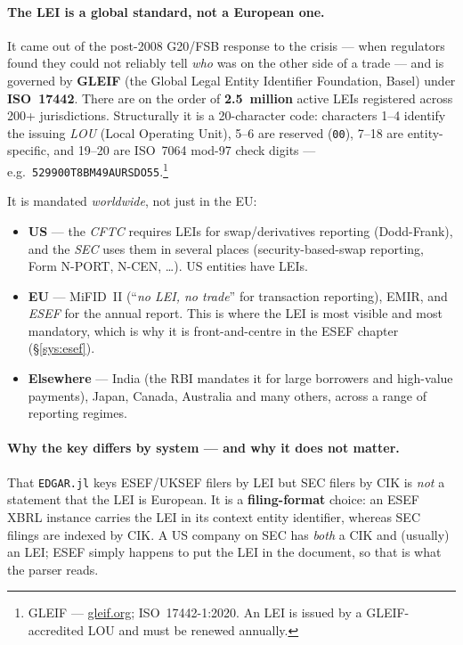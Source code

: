 \documentclass[11pt,a4paper]{report}
\begin{document}
\paragraph{The LEI is a global standard, not a European one.} It came out of the post-2008 G20/FSB response to
the crisis --- when regulators found they could not reliably tell \emph{who} was on the other side of a trade
--- and is governed by \textbf{GLEIF} (the Global Legal Entity Identifier Foundation, Basel) under
\textbf{ISO~17442}. There are on the order of \textbf{2.5~million} active LEIs registered across 200+
jurisdictions. Structurally it is a 20-character code: characters 1--4 identify the issuing \emph{LOU} (Local
Operating Unit), 5--6 are reserved (\texttt{00}), 7--18 are entity-specific, and 19--20 are ISO~7064 mod-97
check digits --- e.g.\ \texttt{529900T8BM49AURSDO55}.\footnote{GLEIF --- \href{https://www.gleif.org}{gleif.org};
ISO~17442-1:2020. An LEI is issued by a GLEIF-accredited LOU and must be renewed annually.}

\noindent It is mandated \emph{worldwide}, not just in the EU:
\begin{itemize}[nosep]
  \item \textbf{US} --- the \emph{CFTC} requires LEIs for swap/derivatives reporting (Dodd-Frank), and the
    \emph{SEC} uses them in several places (security-based-swap reporting, Form N-PORT, N-CEN, \ldots). US
    entities have LEIs.
  \item \textbf{EU} --- MiFID~II (``\emph{no LEI, no trade}'' for transaction reporting), EMIR, and \emph{ESEF}
    for the annual report. This is where the LEI is most visible and most mandatory, which is why it is
    front-and-centre in the ESEF chapter (\S\ref{sys:esef}).
  \item \textbf{Elsewhere} --- India (the RBI mandates it for large borrowers and high-value payments), Japan,
    Canada, Australia and many others, across a range of reporting regimes.
\end{itemize}

\paragraph{Why the key differs by system --- and why it does not matter.} That \texttt{EDGAR.jl} keys
ESEF/UKSEF filers by LEI but SEC filers by CIK is \emph{not} a statement that the LEI is European. It is a
\textbf{filing-format} choice: an ESEF XBRL instance carries the LEI in its context entity identifier, whereas
SEC filings are indexed by CIK. A US company on SEC has \emph{both} a CIK and (usually) an LEI; ESEF simply
happens to put the LEI in the document, so that is what the parser reads.
\end{document}
